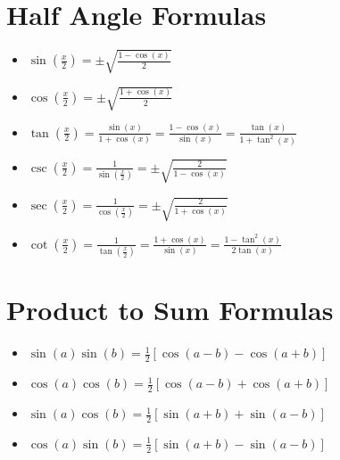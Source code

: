 \section{Half Angle Formulas}

\begin{itemize}

    \item \( \sin\left(\frac{x}{2}\right) = \pm\sqrt{\frac{1 - \cos(x)}{2}} \)

    \item \( \cos\left(\frac{x}{2}\right) = \pm\sqrt{\frac{1 + \cos(x)}{2}} \)

    \item \( \tan\left(\frac{x}{2}\right) = \frac{\sin(x)}{1 + \cos(x)} = \frac{1 - \cos(x)}{\sin(x)} = 
          \frac{\tan(x)}{1 + \tan^2(x)}\)

    \item \( \csc\left(\frac{x}{2}\right) = \frac{1}{\sin\left(\frac{x}{2}\right)} = 
          \pm\sqrt{\frac{2}{1 - \cos(x)}} \)

    \item \( \sec\left(\frac{x}{2}\right) = \frac{1}{\cos\left(\frac{x}{2}\right)} = 
          \pm\sqrt{\frac{2}{1 + \cos(x)}} \)

    \item \( \cot\left(\frac{x}{2}\right) = \frac{1}{\tan\left(\frac{x}{2}\right)} = 
          \frac{1 + \cos(x)}{\sin(x)} = \frac{1 - \tan^2(x)}{2\tan(x)}\)

\end{itemize}

\section{Product to Sum Formulas}

\begin{itemize}

    \item \( \sin(a)\sin(b) = \frac{1}{2}[\cos(a - b) - \cos(a + b)] \)

    \item \( \cos(a)\cos(b) = \frac{1}{2}[\cos(a - b) + \cos(a + b)] \)

    \item \( \sin(a)\cos(b) = \frac{1}{2}[\sin(a + b) + \sin(a - b)] \)

    \item \( \cos(a)\sin(b) = \frac{1}{2}[\sin(a + b) - \sin(a - b)] \)

\end{itemize}

